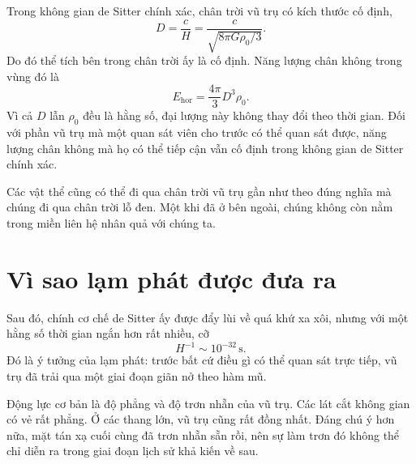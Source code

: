 Trong không gian de Sitter chính xác, chân trời vũ trụ có kích thước cố định,
\begin{equation}
D=\frac{c}{H}
=\frac{c}{\sqrt{8\pi G\rho_0/3}}.
\end{equation}
Do đó thể tích bên trong chân trời ấy là cố định. Năng lượng chân không trong vùng đó là
\begin{equation}
E_{\mathrm{hor}}=\frac{4\pi}{3}D^3\rho_0.
\end{equation}
Vì cả \(D\) lẫn \(\rho_0\) đều là hằng số, đại lượng này không thay đổi theo thời gian. Đối với phần vũ trụ mà một quan sát viên cho trước có thể quan sát được, năng lượng chân không mà họ có thể tiếp cận vẫn cố định trong không gian de Sitter chính xác.

Các vật thể cũng có thể đi qua chân trời vũ trụ gần như theo đúng nghĩa mà chúng đi qua chân trời lỗ đen. Một khi đã ở bên ngoài, chúng không còn nằm trong miền liên hệ nhân quả với chúng ta.

\begin{classroomqa}
\end{classroomqa}

\section{Vì sao lạm phát được đưa ra}

Sau đó, chính cơ chế de Sitter ấy được đẩy lùi về quá khứ xa xôi, nhưng với một hằng số thời gian ngắn hơn rất nhiều, cỡ
\begin{equation}
H^{-1}\sim 10^{-32}\,\mathrm{s}.
\end{equation}
Đó là ý tưởng của lạm phát: trước bất cứ điều gì có thể quan sát trực tiếp, vũ trụ đã trải qua một giai đoạn giãn nở theo hàm mũ.

Động lực cơ bản là độ phẳng và độ trơn nhẵn của vũ trụ. Các lát cắt không gian có vẻ rất phẳng. Ở các thang lớn, vũ trụ cũng rất đồng nhất. Đáng chú ý hơn nữa, mặt tán xạ cuối cùng đã trơn nhẵn sẵn rồi, nên sự làm trơn đó không thể chỉ diễn ra trong giai đoạn lịch sử khả kiến về sau.

